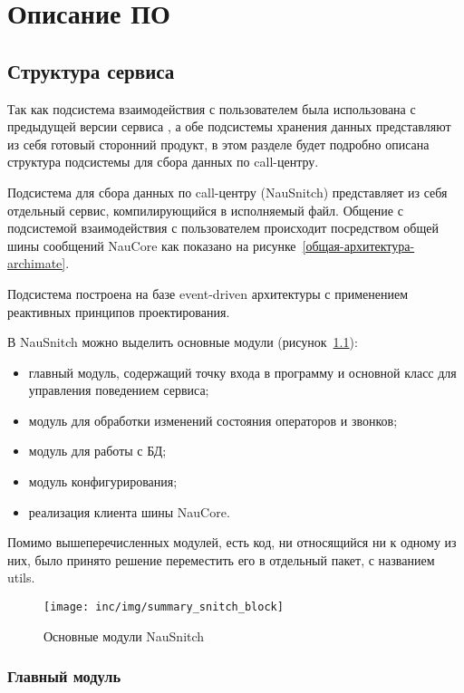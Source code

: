 \chapter{Описание ПО}
\label{ch:impl}

\section{Структура сервиса}

Так как подсистема взаимодействия с пользователем была использована
с предыдущей версии сервиса %
, а обе подсистемы хранения данных представляют из себя
готовый сторонний продукт, в этом разделе будет подробно описана
структура подсистемы для сбора данных по call-центру.

Подсистема для сбора данных по call-центру (NauSnitch) представляет из себя
отдельный сервис, компилирующийся в исполняемый файл.
Общение с подсистемой взаимодействия с пользователем
происходит посредством общей шины сообщений NauCore как показано на рисунке~\ref{общая-архитектура-archimate}.

Подсистема построена на базе event-driven архитектуры
с применением реактивных принципов проектирования.

В NauSnitch можно выделить основные модули (рисунок~\ref{pic:snitch:summary-block}):
\begin{itemize}
    \item главный модуль, содержащий точку входа в программу
    и основной класс для управления поведением сервиса;
    \item модуль для обработки изменений состояния операторов и звонков;
    \item модуль для работы с БД;
    \item модуль конфигурирования;
    \item реализация клиента шины NauCore.
\end{itemize}
Помимо вышеперечисленных модулей, есть код, ни относящийся ни к одному из них,
было принято решение переместить его в отдельный пакет, с названием utils.

\begin{figure}[ht]
    \centering
    \texttt{[image: inc/img/summary\_snitch\_block]}
    \caption{Основные модули NauSnitch}
    \label{pic:snitch:summary-block}
\end{figure}

\subsection{Главный модуль}

